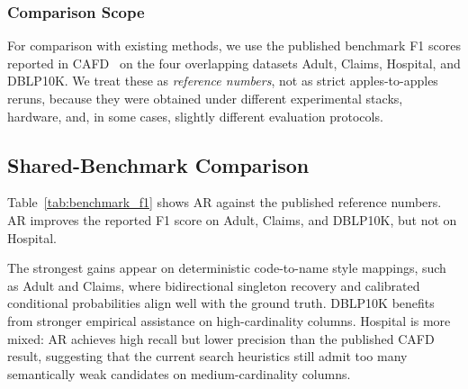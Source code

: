 \documentclass[conference]{IEEEtran}
\begin{document}
\subsubsection{Comparison Scope}

For comparison with existing methods, we use the published benchmark F1 scores reported in CAFD~\cite{cafdui} on the four overlapping datasets Adult, Claims, Hospital, and DBLP10K. We treat these as \emph{reference numbers}, not as strict apples-to-apples reruns, because they were obtained under different experimental stacks, hardware, and, in some cases, slightly different evaluation protocols.

\subsection{Shared-Benchmark Comparison}

Table~\ref{tab:benchmark_f1} shows AR against the published reference numbers. AR improves the reported F1 score on Adult, Claims, and DBLP10K, but not on Hospital.

\begin{table}[t]
\caption{F1 Comparison on Four Shared Benchmarks. Non-AR entries are quoted from~\cite{cafdui}.}
\label{tab:benchmark_f1}
\centering
\scriptsize
{}
\end{table}

The strongest gains appear on deterministic code-to-name style mappings, such as Adult and Claims, where bidirectional singleton recovery and calibrated conditional probabilities align well with the ground truth. DBLP10K benefits from stronger empirical assistance on high-cardinality columns. Hospital is more mixed: AR achieves high recall but lower precision than the published CAFD result, suggesting that the current search heuristics still admit too many semantically weak candidates on medium-cardinality columns.
\end{document}
